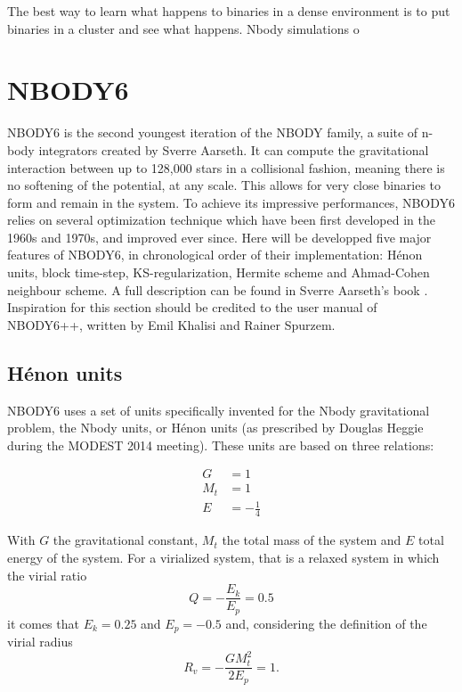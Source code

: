 The best way to learn what happens to binaries in a dense environment is to put binaries in a cluster and see what happens. Nbody simulations o 




\newpage
\section{NBODY6}


NBODY6 is the second youngest iteration of the NBODY family, a suite of n-body integrators created by Sverre Aarseth. It can compute the gravitational interaction between up to 128,000 stars in a collisional fashion, meaning there is no softening of the potential, at any scale. This allows for very close binaries to form and remain in the system. To achieve its impressive performances, NBODY6 relies on several optimization technique which have been first developed in the 1960s and 1970s, and improved ever since. Here will be developped five major features of NBODY6, in chronological order of their implementation: H\'enon units, block time-step, KS-regularization, Hermite scheme and Ahmad-Cohen neighbour scheme. A full description can be found in Sverre Aarseth's book \citep{Aarseth2003}. Inspiration for this section should be credited to the user manual of NBODY6++, written by Emil Khalisi and Rainer Spurzem.

\subsection{H\'enon units}

NBODY6 uses a set of units specifically invented for the Nbody gravitational problem, the Nbody units, or H\'enon units (as prescribed by Douglas Heggie during the MODEST 2014 meeting). These units are based on three relations:

\begin{align}
G &= 1\\
M_t &= 1\\
E &= -\frac{1}{4}
\end{align}

With $G$ the gravitational constant, $M_t$ the total mass of the system and $E$ total energy of the system. For a virialized system, that is a relaxed system in which the virial ratio 
\begin{equation}
Q = - \frac{E_k}{E_p} = 0.5
\end{equation}
it comes that $E_k=0.25$ and $E_p = -0.5$ and, considering the definition of the virial radius 
\begin{equation}
R_v = - \frac{G M_t^2}{2 E_p} = 1.
\end{equation} 

